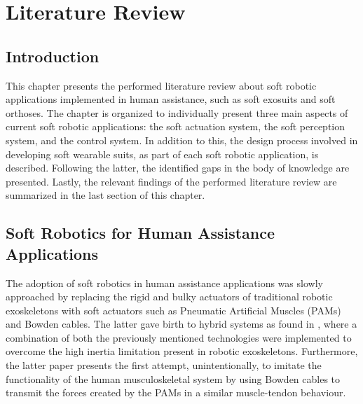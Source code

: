 \chapter{Literature Review} \label{ch2:Literature}

\section{Introduction}

This chapter presents the performed literature review about soft robotic applications implemented in human assistance, such as soft exosuits and soft orthoses. The chapter is organized to individually present three main aspects of current soft robotic applications: the soft actuation system, the soft perception system, and the control system. In addition to this, the design process involved in developing soft wearable suits, as part of each soft robotic application, is described. Following the latter, the identified gaps in the body of knowledge are presented. Lastly, the relevant findings of the performed literature review are summarized in the last section of this chapter.

\section{Soft Robotics for Human Assistance Applications}

The adoption of soft robotics in human assistance applications was slowly approached by replacing the rigid and bulky actuators of traditional robotic exoskeletons with soft actuators such as Pneumatic Artificial Muscles (PAMs) and Bowden cables. The latter gave birth to hybrid systems as found in \cite{Noda2014}, where a combination of both the previously mentioned technologies were implemented to overcome the high inertia limitation present in robotic exoskeletons. Furthermore, the latter paper presents the first attempt, unintentionally, to imitate the functionality of the human musculoskeletal system by using Bowden cables to transmit the forces created by the PAMs in a similar muscle-tendon behaviour. 

